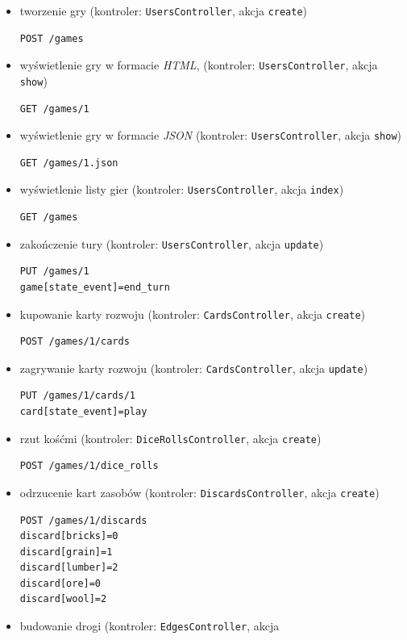 \documentclass[a4paper,12pt]{article}
\begin{document}
\begin{itemize}
\item tworzenie gry (kontroler: \texttt{UsersController}, akcja \texttt{create})
\begin{verbatim}
POST /games
\end{verbatim}
\item wyświetlenie gry w formacie \emph{HTML}, (kontroler:
  \texttt{UsersController}, akcja \texttt{show})
\begin{verbatim}
GET /games/1
\end{verbatim}
\item wyświetlenie gry w formacie \emph{JSON} (kontroler:
  \texttt{UsersController}, akcja \texttt{show})
\begin{verbatim}
GET /games/1.json
\end{verbatim}
\item wyświetlenie listy gier (kontroler: \texttt{UsersController},
  akcja \texttt{index})
\begin{verbatim}
GET /games
\end{verbatim}
\item zakończenie tury (kontroler: \texttt{UsersController}, akcja
  \texttt{update})
\begin{verbatim}
PUT /games/1
game[state_event]=end_turn
\end{verbatim}
\item kupowanie karty rozwoju (kontroler: \texttt{CardsController}, akcja
  \texttt{create})
\begin{verbatim}
POST /games/1/cards
\end{verbatim}
\item zagrywanie karty rozwoju (kontroler: \texttt{CardsController}, akcja
  \texttt{update})
\begin{verbatim}
PUT /games/1/cards/1
card[state_event]=play
\end{verbatim}
\item rzut kośćmi (kontroler: \texttt{DiceRollsController}, akcja
  \texttt{create})
\begin{verbatim}
POST /games/1/dice_rolls
\end{verbatim}
\item odrzucenie kart zasobów (kontroler: \texttt{DiscardsController},
  akcja \texttt{create})
\begin{verbatim}
POST /games/1/discards
discard[bricks]=0
discard[grain]=1
discard[lumber]=2
discard[ore]=0
discard[wool]=2
\end{verbatim}
\item budowanie drogi (kontroler: \texttt{EdgesController}, akcja

\end{itemize}
\end{document}
